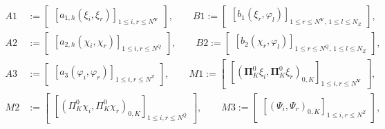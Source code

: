 \documentclass[smallextended]{svjour3}
\numberwithin{equation}{section}
\numberwithin{figure}{section}
\numberwithin{table}{section}
\newcommand\bV{\mathbf{V}}
\newcommand\bPi{\boldsymbol{\Pi}}
\newcommand\ff{\boldsymbol{f}}
\newcommand\by{\boldsymbol{y}}
\newcommand\bu{\boldsymbol{u}}
\newcommand\cT{\mathcal{T}}
\begin{document}
	\begin{align*}
		{A1}&:=	
			\begin{bmatrix}
				[a_{1,h}(\xi_i, \xi_r)]_{1 \le i,r \le N^{\bV}}
			\end{bmatrix}, \qquad  
        B1 :=	\begin{bmatrix}
			[b_1(\xi_r, \varphi_l)]_{1 \le r \le N^{\bV}, \, 1 \le l \le N_Z}  
			\end{bmatrix}, \\
		{A2}&:=	
			\begin{bmatrix}
				[a_{2,h}(\chi_i, \chi_r)]_{1 \le i,r \le N^{Q}}
			\end{bmatrix}, 
		\qquad B2 :=	\begin{bmatrix}
					[b_2(\chi_r, \varphi_l)]_{1 \le r \le N^Q, \, 1 \le l \le N_Z}  
			\end{bmatrix}, 	\\
		{A3}&:=	\begin{bmatrix}
					[a_{3}(\varphi_i, \varphi_r)]_{1 \le i,r \le N^{Z}}
				\end{bmatrix}, 
		\qquad  M1 := \begin{bmatrix}
				[(\bPi^{0}_K \xi_i, \bPi^{0}_K\xi_r)_{0,K}]_{1 \le i,r \le N^{\bV}}
			\end{bmatrix}, \\
        M2 & := \begin{bmatrix}
				[(\Pi^{0}_K \chi_i, \Pi^{0}_K\chi_r)_{0,K}]_{1 \le i,r \le N^{Q}}
			\end{bmatrix}, \qquad 
        M3  := \begin{bmatrix}
				[(\Psi_i, \Psi_r)_{0,K}]_{1 \le i,r \le N^{Z}}
			\end{bmatrix}, \\

\end{align*}
\end{document}
